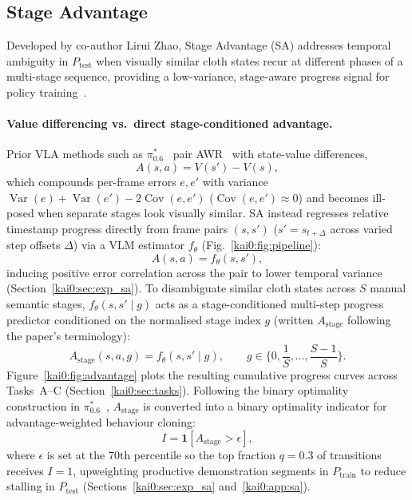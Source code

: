 \subsection{Stage Advantage}\label{kai0:sec:sa}
Developed by co-author Lirui Zhao, Stage Advantage (SA) addresses temporal ambiguity in $P_{\mathrm{test}}$ when visually similar cloth states recur at different phases of a multi-stage sequence, providing a low-variance, stage-aware progress signal for policy training~\cite{sima2026kai0}.

\paragraph{Value differencing vs.\ direct stage-conditioned advantage.} Prior VLA methods such as $\pi^{*}_{0.6}$~\cite{amin2026pistar06} pair AWR~\cite{wu2023elastic,kuba2023advantage} with state-value differences,
\begin{equation}
  A(s, a) = V(s') - V(s),
  \label{kai0:eq:adv_vdiff}
\end{equation}
which compounds per-frame errors $e, e'$ with variance $\operatorname{Var}(e) + \operatorname{Var}(e') - 2\operatorname{Cov}(e, e')$ ($\operatorname{Cov}(e, e') \approx 0$) and becomes ill-posed when separate stages look visually similar. SA instead regresses relative timestamp progress directly from frame pairs $(s, s')$ ($s' = s_{t+\Delta}$ across varied step offsets $\Delta$) via a VLM estimator $f_{\theta}$ (Fig.~\ref{kai0:fig:pipeline}):
\begin{equation}
  A(s, a) = f_{\theta}(s, s'),
  \label{kai0:eq:adv_direct}
\end{equation}
inducing positive error correlation across the pair to lower temporal variance (Section~\ref{kai0:sec:exp_sa}). To disambiguate similar cloth states across $S$ manual semantic stages, $f_{\theta}(s, s' \mid g)$ acts as a stage-conditioned multi-step progress predictor conditioned on the normalised stage index $g$ (written $A_{\mathrm{stage}}$ following the paper's terminology):
\begin{equation}
  A_{\mathrm{stage}}(s, a, g) = f_{\theta}(s, s' \mid g), \qquad g \in \Big\{0, \frac{1}{S}, \dots, \frac{S-1}{S}\Big\}.
  \label{kai0:eq:adv_stage}
\end{equation}
Figure~\ref{kai0:fig:advantage} plots the resulting cumulative progress curves across Tasks~A--C (Section~\ref{kai0:sec:tasks}). Following the binary optimality construction in $\pi^{*}_{0.6}$~\cite{amin2026pistar06}, $A_{\mathrm{stage}}$ is converted into a binary optimality indicator for advantage-weighted behaviour cloning:
\begin{equation}
  I = \mathbf{1}[A_{\mathrm{stage}} > \epsilon],
  \label{kai0:eq:indicator}
\end{equation}
where $\epsilon$ is set at the 70th percentile so the top fraction $q = 0.3$ of transitions receives $I = 1$, upweighting productive demonstration segments in $P_{\mathrm{train}}$ to reduce stalling in $P_{\mathrm{test}}$ (Sections~\ref{kai0:sec:exp_sa} and~\ref{kai0:app:sa}).

